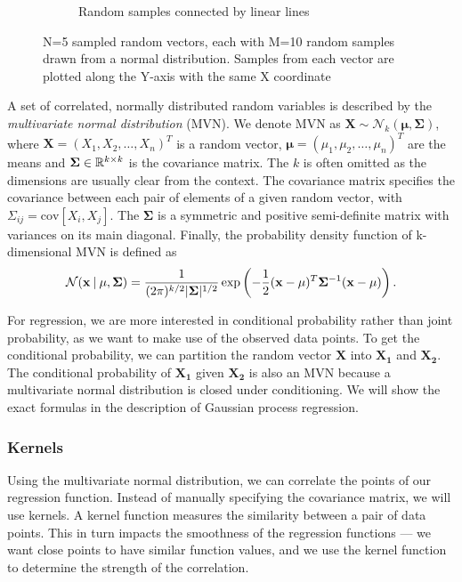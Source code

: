 \begin{figure}
\begin{subfigure}{0.49\textwidth}
        \caption{Random samples connected by linear lines}
    \end{subfigure}
    \caption{N=5 sampled random vectors, each with M=10 random samples drawn from a normal distribution. Samples from each vector are plotted along the Y-axis with the same X coordinate}
    \label{fig:2}
\end{figure}

A set of correlated, normally distributed random variables is described by the \textit{multivariate normal distribution} (MVN). We denote MVN as $\mathbf{X} \sim \mathcal{N}_k(\mathbf{\mu}, \mathbf{\Sigma})$, where $\mathbf{X}=(X_1,X_2,\ldots ,X_n)^T$ is a random vector, $\mathbf{\mu}= (\mu_1,\mu_2,\ldots , \mu_n)^T$ are the means and $\mathbf{\Sigma} \in  \mathbb{R}^{k \times k}$ is the covariance matrix. The $k$ is often omitted as the dimensions are usually clear from the context. The covariance matrix specifies the covariance between each pair of elements of a given random vector, with $\Sigma_{ij} = \text{cov}[X_i, X_j]$. The $\mathbf{\Sigma}$ is a symmetric and positive semi-definite matrix with variances on its main diagonal. Finally, the probability density function of k-dimensional MVN is defined as \[ \mathcal{N}(\mathbf{x} \:\vert\: \mathbf{\mu}, \mathbf{\Sigma}) = \frac{1}{(2\pi)^{k/2} |\mathbf{\Sigma}|^{1/2}} \exp \left(-\frac{1}{2} (\mathbf{x} - \mathbf{\mu})^T \mathbf{\Sigma}^{-1} (\mathbf{x} - \mathbf{\mu}) \right). \]


For regression, we are more interested in conditional probability rather than joint probability, as we want to make use of the observed data points. To get the conditional probability, we can partition the random vector $\mathbf{X}$ into $\mathbf{X_1}$ and $\mathbf{X_2}$. The conditional probability of $\mathbf{X_1}$ given $\mathbf{X_2}$ is also an MVN because a multivariate normal distribution is closed under conditioning. We will show the exact formulas in the description of Gaussian process regression.

%
\subsubsection{Kernels}
Using the multivariate normal distribution, we can correlate the points of our regression function. Instead of manually specifying the covariance matrix, we will use kernels. A kernel function measures the similarity between a pair of data points. This in turn impacts the smoothness of the regression functions --- we want close points to have similar function values, and we use the kernel function to determine the strength of the correlation.

